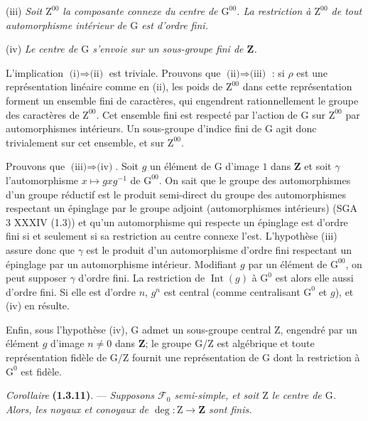 \documentclass[11pt,leqno]{article}
\begin{document}
(iii) \textit{Soit \(\mathrm{Z}^{00}\) la composante connexe du centre de \(\mathrm{G}^{00}\). La restriction à \(\mathrm{Z}^{00}\) de tout automorphisme intérieur de \(\mathrm{G}\) est d’ordre fini.}

(iv) \textit{Le centre de \(\mathrm{G}\) s’envoie sur un sous-groupe fini de \(\mathbf{Z}\).}

L’implication \(\text{(i)}\Rightarrow\text{(ii)}\) est triviale. Prouvons que \(\text{(ii)}\Rightarrow\text{(iii)}\) : si \(\rho\) est une représentation linéaire comme en (ii), les poids de \(\mathrm{Z}^{00}\) dans cette représentation forment un ensemble fini de caractères, qui engendrent rationnellement le groupe des caractères de \(\mathrm{Z}^{00}\). Cet ensemble fini est respecté par l’action de \(\mathrm{G}\) sur \(\mathrm{Z}^{00}\) par automorphismes intérieurs. Un sous-groupe d’indice fini de \(\mathrm{G}\) agit donc trivialement sur cet ensemble, et sur \(\mathrm{Z}^{00}\).

Prouvons que \(\text{(iii)}\Rightarrow\text{(iv)}\). Soit \(g\) un élément de \(\mathrm{G}\) d’image \(1\) dans \(\mathbf{Z}\) et soit \(\gamma\) l’automorphisme \(x\mapsto gxg^{-1}\) de \(\mathrm{G}^{00}\). On sait que le groupe des automorphismes d’un groupe réductif est le produit semi-direct du groupe des automorphismes respectant un épinglage par le groupe adjoint (automorphismes intérieurs) (SGA 3 XXXIV (1.3)) et qu’un automorphisme qui respecte un épinglage est d’ordre fini si et seulement si sa restriction au centre connexe l’est. L’hypothèse (iii) assure donc que \(\gamma\) est le produit d’un automorphisme d’ordre fini respectant un épinglage par un automorphisme intérieur. Modifiant \(g\) par un élément de \(\mathrm{G}^{00}\), on peut supposer \(\gamma\) d’ordre fini. La restriction de \(\operatorname{Int}(g)\) à \(\mathrm{G}^0\) est alors elle aussi d’ordre fini. Si elle est d’ordre \(n\), \(g^n\) est central (comme centralisant \(\mathrm{G}^0\) et \(g\)), et (iv) en résulte.

Enfin, sous l’hypothèse (iv), \(\mathrm{G}\) admet un sous-groupe central \(\mathrm{Z}\), engendré par un élément \(g\) d’image \(n\ne0\) dans \(\mathbf{Z}\); le groupe \(\mathrm{G}/\mathrm{Z}\) est algébrique et toute représentation fidèle de \(\mathrm{G}/\mathrm{Z}\) fournit une représentation de \(\mathrm{G}\) dont la restriction à \(\mathrm{G}^0\) est fidèle.

\textit{Corollaire} \textbf{(1.3.11)}. — \textit{Supposons \(\mathscr{F}_0\) semi-simple, et soit \(\mathrm{Z}\) le centre de \(\mathrm{G}\). Alors, les noyaux et conoyaux de \(\deg:\mathrm{Z}\to\mathbf{Z}\) sont finis.}
\end{document}
